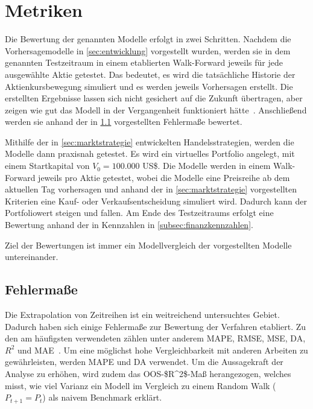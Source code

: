 \section{Metriken}\label{sec:bewertungskriterien} %

Die Bewertung der genannten Modelle erfolgt in zwei Schritten. Nachdem die Vorhersagemodelle in \cref{sec:entwicklung} vorgestellt wurden, werden sie in dem genannten Testzeitraum in einem etablierten Walk-Forward jeweils für jede ausgewählte Aktie getestet. Das bedeutet, es wird die tatsächliche Historie der Aktienkursbewegung simuliert und es werden jeweils Vorhersagen erstellt. Die erstellten Ergebnisse lassen sich nicht gesichert auf die Zukunft übertragen, aber zeigen wie gut das Modell in der Vergangenheit funktioniert hätte~\cite{Olorunnimbe2023}. Anschließend werden sie anhand der in \cref{subsec:fehlermasse} vorgestellten Fehlermaße bewertet.

Mithilfe der in \cref{sec:marktstrategie} entwickelten Handelsstrategien, werden die Modelle dann praxisnah getestet. Es wird ein virtuelles Portfolio angelegt, mit einem Startkapital von $ V_0 = 100.000 $ US\$. Die Modelle werden in einem Walk-Forward jeweils pro Aktie getestet, wobei die Modelle eine Preisreihe ab dem aktuellen Tag vorhersagen und anhand der in \cref{sec:marktstrategie} vorgestellten Kriterien eine Kauf- oder Verkaufsentscheidung simuliert wird. Dadurch kann der Portfoliowert steigen und fallen. Am Ende des Testzeitraums erfolgt eine Bewertung anhand der in Kennzahlen in \cref{subsec:finanzkennzahlen}.

Ziel der Bewertungen ist immer ein Modellvergleich der vorgestellten Modelle untereinander.

\subsection{Fehlermaße}\label{subsec:fehlermasse}

Die Extrapolation von Zeitreihen ist ein weitreichend untersuchtes Gebiet. Dadurch haben sich einige Fehlermaße zur Bewertung der Verfahren etabliert. Zu den am häufigsten verwendeten zählen unter anderem \ac{MAPE}, \ac{RMSE}, \ac{MSE}, \ac{DA}, $R^2$ und \ac{MAE}~\cite{gandhmal2019systematic,metrics_review2021}. Um eine möglichst hohe Vergleichbarkeit mit anderen Arbeiten zu gewährleisten, werden \ac{MAPE} und \ac{DA} verwendet. Um die Aussagekraft der Analyse zu erhöhen, wird zudem das \ac{OOS-$R^2$}-Maß herangezogen, welches misst, wie viel Varianz ein Modell im Vergleich zu einem Random Walk ($P_{t+1} = P_t$) als naivem Benchmark erklärt.

